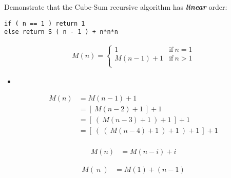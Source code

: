 \documentclass[10pt,a4paper]{article}
\begin{document}
Demonstrate that the Cube-Sum recursive algorithm has {\bfseries\itshape linear} order: \hfill \break

\begin{lstlisting}
if ( n == 1 ) return 1
else return S ( n - 1 ) + n*n*n
\end{lstlisting}

\begin{ceqn}
\begin{align}
M( n ) = \left\{
\begin{array}{ll}
1 & \mathrm {if\ } n = 1 \\
M(n-1) + 1 & \mathrm {if\ } n > 1 \\
\end{array}
\right.
\end{align}
\end{ceqn} 

\begin{itemize}
\item {\bfseries\itshape\color{Maroon}{Demonstration:}} \hfill
\end{itemize}

\begin{ceqn}
\begin{align} 
M ( n ) &= M ( n - 1 ) + 1  \\
&= [\ M ( n - 2 ) + 1\ ] + 1 \\
&= [\ (\ M ( n - 3 ) +1\ ) + 1\ ] + 1 \\
&= [\ (\ (\ M ( n - 4 ) + 1\ ) + 1\ ) + 1\ ] + 1 \\ 
\end{align}
\end{ceqn}

{\bfseries\itshape\color{CadetBlue}{So on:}}

\begin{ceqn}
\begin{align} 
M ( n ) &= M ( n - i ) + i 
\end{align}
\end{ceqn}

{\bfseries\itshape\color{CadetBlue}{Substituting: \hfill \break
\begin{tasks}
\task n - i = 1.
\task i = n - 1.
\end{tasks}}} \hfill

{\bfseries\itshape\color{CadetBlue}{then:}}

\begin{ceqn}
\begin{align}
M(\ n\ ) &= M (1) + ( n - 1 ) \\
\end{align}
\end{ceqn}
\end{document}
